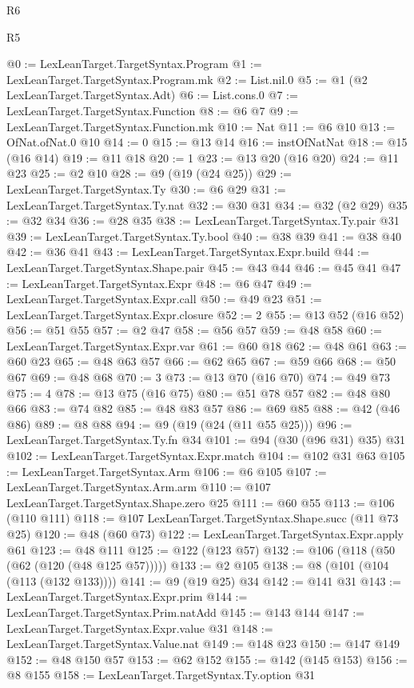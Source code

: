 \begin{lexlean}{R6}
\begin{lexlean}{R5}
\begin{coremodule}
{{{{{{{{{@0 := LexLeanTarget.TargetSyntax.Program
@1 := LexLeanTarget.TargetSyntax.Program.mk
@2 := List.nil.{0}
@5 := @1 (@2 LexLeanTarget.TargetSyntax.Adt)
@6 := List.cons.{0}
@7 := LexLeanTarget.TargetSyntax.Function
@8 := @6 @7
@9 := LexLeanTarget.TargetSyntax.Function.mk
@10 := Nat
@11 := @6 @10
@13 := OfNat.ofNat.{0} @10
@14 := 0
@15 := @13 @14
@16 := instOfNatNat
@18 := @15 (@16 @14)
@19 := @11 @18
@20 := 1
@23 := @13 @20 (@16 @20)
@24 := @11 @23
@25 := @2 @10
@28 := @9 (@19 (@24 @25))
@29 := LexLeanTarget.TargetSyntax.Ty
@30 := @6 @29
@31 := LexLeanTarget.TargetSyntax.Ty.nat
@32 := @30 @31
@34 := @32 (@2 @29)
@35 := @32 @34
@36 := @28 @35
@38 := LexLeanTarget.TargetSyntax.Ty.pair @31
@39 := LexLeanTarget.TargetSyntax.Ty.bool
@40 := @38 @39
@41 := @38 @40
@42 := @36 @41
@43 := LexLeanTarget.TargetSyntax.Expr.build
@44 := LexLeanTarget.TargetSyntax.Shape.pair
@45 := @43 @44
@46 := @45 @41
@47 := LexLeanTarget.TargetSyntax.Expr
@48 := @6 @47
@49 := LexLeanTarget.TargetSyntax.Expr.call
@50 := @49 @23
@51 := LexLeanTarget.TargetSyntax.Expr.closure
@52 := 2
@55 := @13 @52 (@16 @52)
@56 := @51 @55
@57 := @2 @47
@58 := @56 @57
@59 := @48 @58
@60 := LexLeanTarget.TargetSyntax.Expr.var
@61 := @60 @18
@62 := @48 @61
@63 := @60 @23
@65 := @48 @63 @57
@66 := @62 @65
@67 := @59 @66
@68 := @50 @67
@69 := @48 @68
@70 := 3
@73 := @13 @70 (@16 @70)
@74 := @49 @73
@75 := 4
@78 := @13 @75 (@16 @75)
@80 := @51 @78 @57
@82 := @48 @80 @66
@83 := @74 @82
@85 := @48 @83 @57
@86 := @69 @85
@88 := @42 (@46 @86)
@89 := @8 @88
@94 := @9 (@19 (@24 (@11 @55 @25)))
@96 := LexLeanTarget.TargetSyntax.Ty.fn @34
@101 := @94 (@30 (@96 @31) @35) @31
@102 := LexLeanTarget.TargetSyntax.Expr.match
@104 := @102 @31 @63
@105 := LexLeanTarget.TargetSyntax.Arm
@106 := @6 @105
@107 := LexLeanTarget.TargetSyntax.Arm.arm
@110 := @107 LexLeanTarget.TargetSyntax.Shape.zero @25
@111 := @60 @55
@113 := @106 (@110 @111)
@118 := @107 LexLeanTarget.TargetSyntax.Shape.succ (@11 @73 @25)
@120 := @48 (@60 @73)
@122 := LexLeanTarget.TargetSyntax.Expr.apply @61
@123 := @48 @111
@125 := @122 (@123 @57)
@132 := @106 (@118 (@50 (@62 (@120 (@48 @125 @57)))))
@133 := @2 @105
@138 := @8 (@101 (@104 (@113 (@132 @133))))
@141 := @9 (@19 @25) @34
@142 := @141 @31
@143 := LexLeanTarget.TargetSyntax.Expr.prim
@144 := LexLeanTarget.TargetSyntax.Prim.natAdd
@145 := @143 @144
@147 := LexLeanTarget.TargetSyntax.Expr.value @31
@148 := LexLeanTarget.TargetSyntax.Value.nat
@149 := @148 @23
@150 := @147 @149
@152 := @48 @150 @57
@153 := @62 @152
@155 := @142 (@145 @153)
@156 := @8 @155
@158 := LexLeanTarget.TargetSyntax.Ty.option @31
}}}}}}}}}
\end{coremodule}
\end{lexlean}
\end{lexlean}
